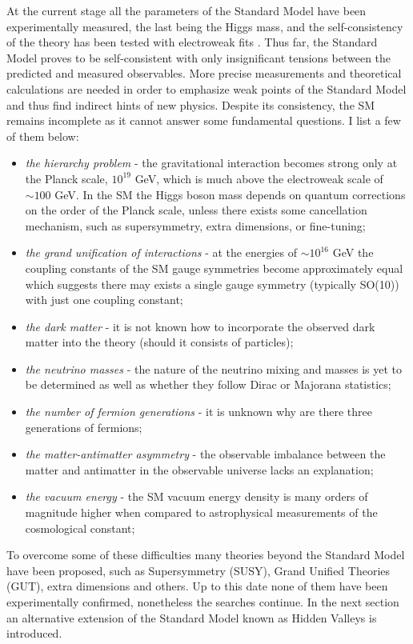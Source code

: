 At the current stage all the parameters of the Standard Model have been experimentally measured,
the last being the Higgs mass, and the
self-consistency of the theory has been tested with electroweak fits \cite{Baak:2013ppa}.
Thus far, the Standard Model proves to be self-consistent with only insignificant tensions between
the predicted and measured observables. More precise measurements and theoretical calculations
are needed in order to emphasize weak points of the Standard Model and thus
find indirect hints of new physics.
Despite its consistency, the SM remains incomplete as it cannot answer some fundamental 
questions. I list a few of them below:
\begin{itemize}
 \item {\it the hierarchy problem} - the gravitational interaction becomes strong only at the 
Planck scale, $10^{19}$ GeV, which is much above the electroweak scale of $\sim 100$ GeV. 
In the SM the Higgs boson mass 
depends on quantum corrections on the order of the Planck scale, unless there
exists some cancellation mechanism, such as supersymmetry, extra dimensions, or fine-tuning; 
 \item {\it the grand unification of interactions} - at the energies of $\sim 10^{16}$ GeV
the coupling constants of the SM gauge symmetries become approximately equal which suggests
there may exists a single gauge symmetry (typically SO(10)) with just one coupling constant;
 \item {\it the dark matter} - it is not known how to incorporate the observed
 dark matter into the theory (should it consists of particles);
 \item {\it the neutrino masses} - the nature of the neutrino mixing and masses is yet to be
determined as well as whether they follow Dirac or Majorana statistics;
 \item {\it the number of fermion generations} - it is unknown why are there three generations
of fermions;
 \item {\it the matter-antimatter asymmetry} - the observable imbalance between the matter and
antimatter in the observable universe lacks an explanation;
 \item {\it the vacuum energy} - the SM vacuum
energy density is many orders of magnitude higher when compared to astrophysical measurements
of the cosmological constant;
\end{itemize}
To overcome some of these difficulties many theories beyond the Standard Model have been
proposed, such as Supersymmetry (SUSY), Grand Unified Theories (GUT), extra dimensions and others.
Up to this date none of them have been experimentally confirmed, nonetheless the searches continue.
In the next section an alternative extension of the Standard Model known as Hidden Valleys 
is introduced. 

